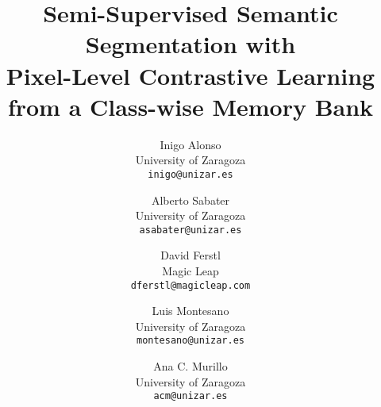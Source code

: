 \documentclass[10pt,twocolumn,letterpaper]{article}
\begin{document}
\title{Semi-Supervised Semantic Segmentation with \\ Pixel-Level Contrastive Learning from a Class-wise  Memory Bank}


\author{Inigo Alonso\\
University of Zaragoza\\
{\tt\small inigo@unizar.es}

\and
Alberto Sabater\\
University of Zaragoza\\
{\tt\small asabater@unizar.es}

\and
David Ferstl\\
Magic Leap\\
{\tt\small dferstl@magicleap.com}

\and
Luis Montesano\\
University of Zaragoza\\
{\tt\small montesano@unizar.es}

\and
Ana C. Murillo\\
University of Zaragoza\\
{\tt\small acm@unizar.es}

}




\maketitle
\ificcvfinal\thispagestyle{empty}\fi



\newif\ifdraft
\draftfalse





\ificcvfinal
 \newcommand{\INIGO}[1]{}
 \newcommand{\inigo}[1]{}
 \newcommand{\DF}[1]{}
 \newcommand{\df}[1]{}
 \newcommand{\ANA}[1]{}
 \newcommand{\ana}[1]{}
 \newcommand{\LUIS}[1]{}
 \newcommand{\luis}[1]{}
\else
 \newcommand{\INIGO}[1]{{\color{orange}{\bf Inigo: #1}}}
 \newcommand{\inigo}[1]{{\color{orange} #1}}
 \newcommand{\DF}[1]{{\color{cyan}{\bf David: #1}}}
 \newcommand{\df}[1]{{\color{cyan} #1}}
 \newcommand{\ANA}[1]{{\color{purple}{\bf Ana: #1}}}
 \newcommand{\ana}[1]{{\color{purple} #1}}
 \newcommand{\LUIS}[1]{{\color{blue}{\bf Luis: #1}}}
 \newcommand{\luis}[1]{{\color{blue} #1}}
\fi

\newcommand{\comment}[1]{}
\newcommand{\parag}[1]{\paragraph{#1}}
\renewcommand{\floatpagefraction}{.99}
\end{document}
